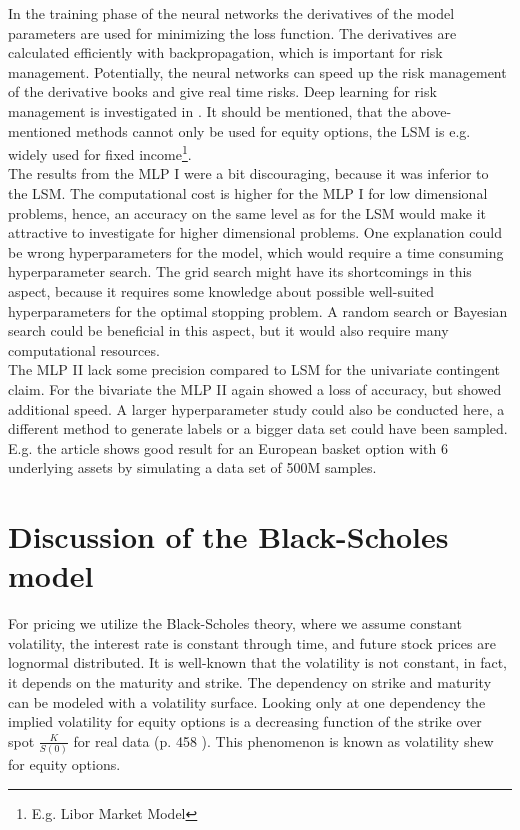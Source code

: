 In the training phase of the neural networks the derivatives of the model parameters are used for minimizing the loss function. The derivatives are calculated efficiently with backpropagation, which is important for risk management. Potentially, the neural networks can speed up the risk management of the derivative books and give real time risks. Deep learning for risk management is investigated in \parencite{AntoineSavine}. It should be mentioned, that the above-mentioned methods cannot only be used for equity options, the LSM is e.g. widely used for fixed income\footnote{E.g. Libor Market Model}.\\

The results from the MLP I were a bit discouraging, because it was inferior to the LSM. The computational cost is higher for the MLP I for low dimensional problems, hence, an accuracy on the same level as for the LSM would make it attractive to investigate for higher dimensional problems. One explanation could be wrong hyperparameters for the model, which would require a time consuming hyperparameter search. The grid search might have its shortcomings in this aspect, because it requires some knowledge about possible well-suited hyperparameters for the optimal stopping problem. A random search or Bayesian search could be beneficial in this aspect, but it would also require many computational resources.\\

The MLP II lack some precision compared to LSM for the univariate contingent claim. For the bivariate the MLP II again showed a loss of accuracy, but showed additional speed. A larger hyperparameter study could also be conducted here, a different method to generate labels or a bigger data set could have been sampled. E.g. the article \parencite{FergusonRyan2018} shows good result for an European basket option with 6 underlying assets by simulating a data set of 500M samples. 

\section{Discussion of the Black-Scholes model}
For pricing we utilize the Black-Scholes theory, where we assume constant volatility, the interest rate is constant through time, and future stock prices are lognormal distributed. It is well-known that the volatility is not constant, in fact, it depends on the maturity and strike. The dependency on strike and maturity can be modeled with a volatility surface. Looking only at one dependency the implied volatility for equity options is a decreasing function of the strike over spot $\frac{K}{S(0)}$ for real data (p. 458 \parencite{Hull}). This phenomenon is known as volatility shew for equity options. \\


